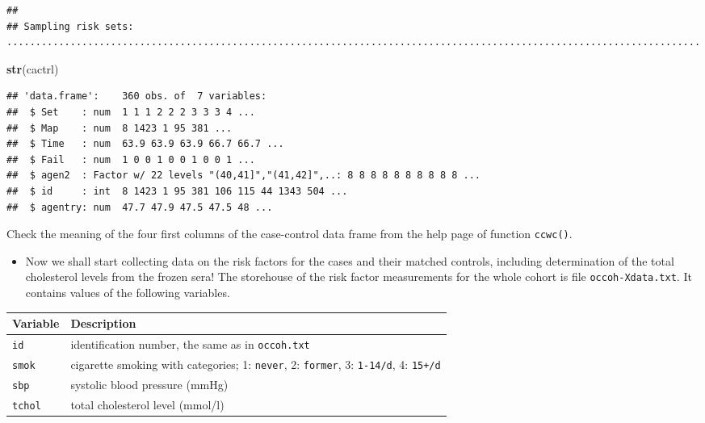 \documentclass[
]{book}
\newenvironment{Shaded}{\begin{snugshade}}{\end{snugshade}}
\newcommand{\FunctionTok}[1]{\textcolor[rgb]{0.13,0.29,0.53}{\textbf{#1}}}
\newcommand{\NormalTok}[1]{#1}
\newcounter{none} %
\providecommand{\tightlist}{%
  \setlength{\itemsep}{0pt}\setlength{\parskip}{0pt}}
\begin{document}
\begin{verbatim}
## 
## Sampling risk sets: ........................................................................................................................
\end{verbatim}

\begin{Shaded}
\begin{Highlighting}[]
\FunctionTok{str}\NormalTok{(cactrl)}
\end{Highlighting}
\end{Shaded}

\begin{verbatim}
## 'data.frame':    360 obs. of  7 variables:
##  $ Set    : num  1 1 1 2 2 2 3 3 3 4 ...
##  $ Map    : num  8 1423 1 95 381 ...
##  $ Time   : num  63.9 63.9 63.9 66.7 66.7 ...
##  $ Fail   : num  1 0 0 1 0 0 1 0 0 1 ...
##  $ agen2  : Factor w/ 22 levels "(40,41]","(41,42]",..: 8 8 8 8 8 8 8 8 8 8 ...
##  $ id     : int  8 1423 1 95 381 106 115 44 1343 504 ...
##  $ agentry: num  47.7 47.9 47.5 47.5 48 ...
\end{verbatim}

Check the meaning of the four first columns of the case-control
data frame from the help page of function \texttt{ccwc()}.

\begin{itemize}
\tightlist
\item
  Now we shall start collecting data on the
  risk factors for the cases and their
  matched controls, including determination of the total cholesterol
  levels from the frozen sera! The storehouse of the risk factor measurements for
  the whole cohort is file \texttt{occoh-Xdata.txt}. It contains
  values of the following variables.
\end{itemize}

{\def\LTcaptype{none} %
\begin{longtable}[]{@{}
  >{\raggedright\arraybackslash}p{}
  >{\raggedright\arraybackslash}p{}@{}}
\toprule\noalign{}
\begin{minipage}[b]{\linewidth}\raggedright
Variable
\end{minipage} & \begin{minipage}[b]{\linewidth}\raggedright
Description
\end{minipage} \\
\midrule\noalign{}
\endhead
\bottomrule\noalign{}
\endlastfoot
\texttt{id} & identification number, the same as in \texttt{occoh.txt} \\
\texttt{smok} & cigarette smoking with categories; 1: \texttt{never}, 2: \texttt{former}, 3: \texttt{1-14/d}, 4: \texttt{15+/d} \\
\texttt{sbp} & systolic blood pressure (mmHg) \\
\texttt{tchol} & total cholesterol level (mmol/l) \\
\end{longtable}
}
\end{document}
